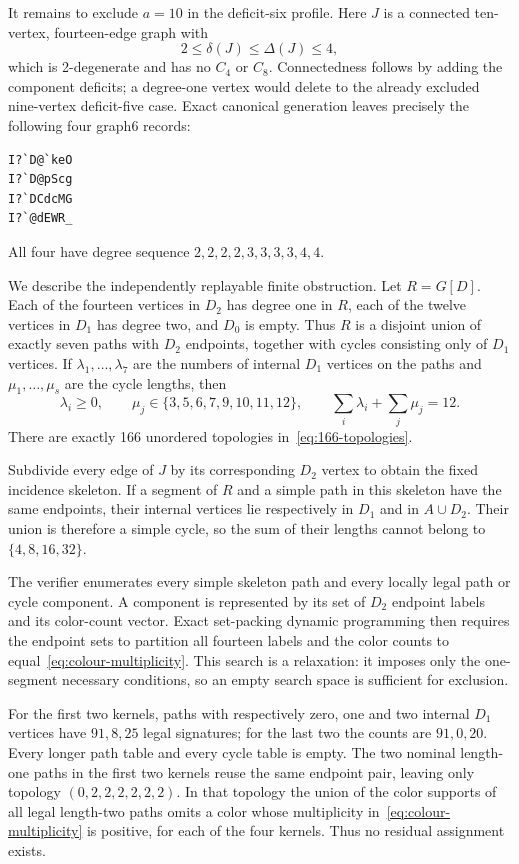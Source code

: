 \documentclass[11pt]{article}
\begin{document}
It remains to exclude $a=10$ in the deficit-six profile.  Here $J$ is a
connected ten-vertex, fourteen-edge graph with
\[
 2\le\delta(J)\le\Delta(J)\le4,
\]
which is 2-degenerate and has no $C_4$ or $C_8$.  Connectedness follows by
adding the component deficits; a degree-one vertex would delete to the
already excluded nine-vertex deficit-five case.  Exact canonical generation
leaves precisely the following four graph6 records:
\begin{verbatim}
I?`D@`keO
I?`D@pScg
I?`DCdcMG
I?`@dEWR_
\end{verbatim}
All four have degree sequence
$2,2,2,2,3,3,3,3,4,4$.

We describe the independently replayable finite obstruction.  Let
$R=G[D]$.  Each of the fourteen vertices in $D_2$ has degree one in $R$,
each of the twelve vertices in $D_1$ has degree two, and $D_0$ is empty.
Thus $R$ is a disjoint union of exactly seven paths with $D_2$ endpoints,
together with cycles consisting only of $D_1$ vertices.  If
$\lambda_1,\ldots,\lambda_7$ are the numbers of internal $D_1$ vertices on
the paths and $\mu_1,\ldots,\mu_s$ are the cycle lengths, then
\begin{equation}\label{eq:166-topologies}
 \lambda_i\ge0,\qquad
 \mu_j\in\{3,5,6,7,9,10,11,12\},\qquad
 \sum_i\lambda_i+\sum_j\mu_j=12.
\end{equation}
There are exactly 166 unordered topologies in~\eqref{eq:166-topologies}.

Subdivide every edge of $J$ by its corresponding $D_2$ vertex to obtain the
fixed incidence skeleton.  If a segment of $R$ and a simple path in this
skeleton have the same endpoints, their internal vertices lie respectively
in $D_1$ and in $A\cup D_2$.  Their union is therefore a simple cycle, so
the sum of their lengths cannot belong to $\{4,8,16,32\}$.

The verifier enumerates every simple skeleton path and every locally legal
path or cycle component.  A component is represented by its set of $D_2$
endpoint labels and its color-count vector.  Exact set-packing dynamic
programming then requires the endpoint sets to partition all fourteen
labels and the color counts to equal~\eqref{eq:colour-multiplicity}.  This
search is a relaxation: it imposes only the one-segment necessary
conditions, so an empty search space is sufficient for exclusion.

For the first two kernels, paths with respectively zero, one and two
internal $D_1$ vertices have $91,8,25$ legal signatures; for the last two
the counts are $91,0,20$.  Every longer path table and every cycle table is
empty.  The two nominal length-one paths in the first two kernels reuse the
same endpoint pair, leaving only topology $(0,2,2,2,2,2,2)$.  In that
topology the union of the color supports of all legal length-two paths omits
a color whose multiplicity in~\eqref{eq:colour-multiplicity} is positive,
for each of the four kernels.  Thus no residual assignment exists.
\end{document}
